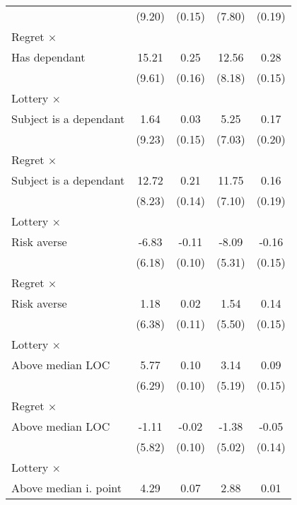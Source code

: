 \begin{table}[htbp]
\begin{tabular}{l*{4}{c}}
                &   (9.20)         &   (0.15)         &   (7.80)         &   (0.19)         \\
\addlinespace
Regret $\times$ \\ Has dependant&    15.21         &     0.25         &    12.56         &     0.28\sym{*}  \\
                &   (9.61)         &   (0.16)         &   (8.18)         &   (0.15)         \\
\addlinespace
Lottery $\times$ \\ Subject is a dependant&     1.64         &     0.03         &     5.25         &     0.17         \\
                &   (9.23)         &   (0.15)         &   (7.03)         &   (0.20)         \\
\addlinespace
Regret $\times$ \\ Subject is a dependant&    12.72         &     0.21         &    11.75\sym{*}  &     0.16         \\
                &   (8.23)         &   (0.14)         &   (7.10)         &   (0.19)         \\
\addlinespace
Lottery $\times$ \\ Risk averse&    -6.83         &    -0.11         &    -8.09         &    -0.16         \\
                &   (6.18)         &   (0.10)         &   (5.31)         &   (0.15)         \\
\addlinespace
Regret $\times$ \\ Risk averse&     1.18         &     0.02         &     1.54         &     0.14         \\
                &   (6.38)         &   (0.11)         &   (5.50)         &   (0.15)         \\
\addlinespace
Lottery $\times$ \\ Above median LOC&     5.77         &     0.10         &     3.14         &     0.09         \\
                &   (6.29)         &   (0.10)         &   (5.19)         &   (0.15)         \\
\addlinespace
Regret $\times$ \\ Above median LOC&    -1.11         &    -0.02         &    -1.38         &    -0.05         \\
                &   (5.82)         &   (0.10)         &   (5.02)         &   (0.14)         \\
\addlinespace
Lottery $\times$ \\ Above median i. point&     4.29         &     0.07         &     2.88         &     0.01         \\

\end{tabular}
\end{table}
